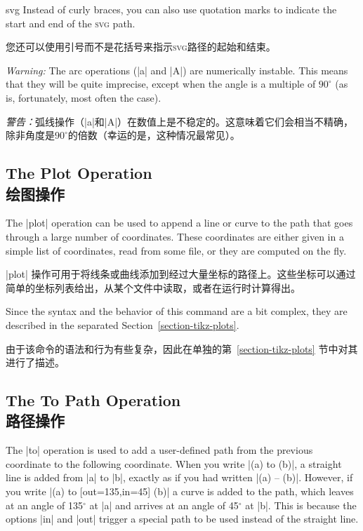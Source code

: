 \begin{pathoperation}{svg}{}
    Instead of curly braces, you can also use quotation marks to indicate the
    start and end of the \textsc{svg} path.

    您还可以使用引号而不是花括号来指示\textsc{svg}路径的起始和结束。


    \emph{Warning:} The arc operations (|a| and |A|) are  numerically instable.
    This means that they will be quite imprecise, except when the angle is a
    multiple of $90^\circ$ (as is, fortunately, most often the case).

    \emph{警告：}弧线操作（|a|和|A|）在数值上是不稳定的。这意味着它们会相当不精确，除非角度是$90^\circ$的倍数（幸运的是，这种情况最常见）。

\end{pathoperation}


\subsection{The Plot Operation\\绘图操作}

The |plot| operation can be used to append a line or curve to the path that
goes through a large number of coordinates. These coordinates are either given
in a simple list of coordinates, read from some file, or they are computed on
the fly.

|plot| 操作可用于将线条或曲线添加到经过大量坐标的路径上。这些坐标可以通过简单的坐标列表给出，从某个文件中读取，或者在运行时计算得出。



Since the syntax and the behavior of this command are a bit complex, they are
described in the separated Section~\ref{section-tikz-plots}.

由于该命令的语法和行为有些复杂，因此在单独的第~\ref{section-tikz-plots} 节中对其进行了描述。


\subsection{The To Path Operation\\路径操作}

The |to| operation is used to add a user-defined path from the previous
coordinate to the following coordinate. When you write |(a) to (b)|, a straight
line is added from |a| to |b|, exactly as if you had written |(a) -- (b)|.
However, if you write |(a) to [out=135,in=45] (b)| a curve is added to the
path, which leaves at an angle of 135$^\circ$ at |a| and arrives at an angle of
45$^\circ$ at |b|. This is because the options |in| and |out| trigger a special
path to be used instead of the straight line.


